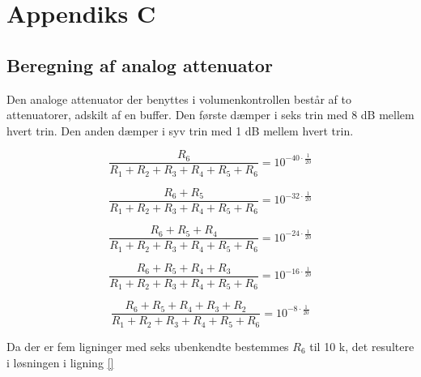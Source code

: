 \chapter{Appendiks C}
\label{beregning-af-analog-attenuator}
\section*{Beregning af analog attenuator}

Den analoge attenuator der benyttes i volumenkontrollen består af to attenuatorer, adskilt af en buffer. Den første dæmper i seks trin med 8 dB mellem hvert trin. Den anden dæmper i syv trin med 1 dB mellem hvert trin.

\begin{equation}
\frac{R_6}{R_1 + R_2 + R_3 + R_4 + R_5 + R_6} = 10^{-40 \cdot \frac{1}{20}}
\end{equation}

\begin{equation}
\frac{R_6 + R_5}{R_1 + R_2 + R_3 + R_4 + R_5 + R_6} = 10^{-32 \cdot \frac{1}{20}}
\end{equation}

\begin{equation}
\frac{R_6 + R_5 + R_4}{R_1 + R_2 + R_3 + R_4 + R_5 + R_6} = 10^{-24 \cdot \frac{1}{20}}
\end{equation}

\begin{equation}
\frac{R_6 + R_5 + R_4 + R_3}{R_1 + R_2 + R_3 + R_4 + R_5 + R_6} = 10^{-16 \cdot \frac{1}{20}}
\end{equation}

\begin{equation}
\frac{R_6 + R_5 + R_4 + R_3 + R_2}{R_1 + R_2 + R_3 + R_4 + R_5 + R_6} = 10^{-8 \cdot \frac{1}{20}}
\end{equation}

Da der er fem ligninger med seks ubenkendte bestemmes $R_6$ til 10 k\ohm, det resultere i løsningen i ligning \ref{}

